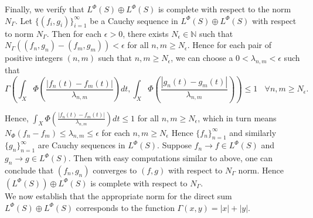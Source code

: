 \documentclass[pdflatex,sn-mathphys-num]{sn-jnl}%
\theoremstyle{thmstyleone}%
\theoremstyle{thmstyletwo}%
\theoremstyle{thmstylethree}%
\begin{document}
Finally, we verify that $L^\Phi(S)\oplus L^\Phi(S)$ is complete with respect to the norm $N_\Gamma$. Let $\{(f_i,g_i)\}_{i=1}^\infty$ be a Cauchy sequence in $L^\Phi(S)\oplus L^\Phi(S)$ with respect to  norm $N_\Gamma$. Then for each $\epsilon>0$, there exists $N_\epsilon\in \mathbb N$ such that $N_\Gamma((f_n,g_n)-(f_m,g_m))<\epsilon$ for all $n,m\geq N_\epsilon$. Hence for each pair of positive integers $(n,m)$ such that $n,m\geq N_\epsilon$, we can choose a $0<\lambda_{n,m}<\epsilon$ such that $$\Gamma\left(\int_X\Phi\left(\frac{|f_n(t)-f_m(t)|}{\lambda_{n,m}}\right)dt, \int_X\Phi\left(\frac{|g_n(t)-g_m(t)|}{\lambda_{n,m}}\right)\right)\leq 1~~~~\forall n,m\geq N_\epsilon.$$

Hence, $\int_X\Phi\left(\frac{|f_n(t)-f_m(t)|}{\lambda_{n,m}}\right)dt\leq 1$ for all $n,m\geq N_\epsilon$, which in turn means $N_\Phi(f_n-f_m)\leq\lambda_{n,m}\leq \epsilon$ for each $n,m\geq N_\epsilon$ Hence $\{f_n\}_{n=1}^\infty$ and similarly $\{g_n\}_{n=1}^\infty$ are Cauchy sequences in $L^\Phi(S)$. Suppose $f_n\to f\in L^\Phi(S)$ and $g_n\to g\in L^\Phi(S)$. Then with easy computations similar to above, one can conclude that $(f_n,g_n)$ converges to $(f,g)$ with respect to $N_\Gamma$ norm. Hence $(L^\Phi(S))\oplus L^\Phi(S)$ is complete with respect to $N_\Gamma$.\\

We now establish that the appropriate norm for the direct sum $L^\Phi(S)\oplus L^\Phi(S)$ corresponds to the function $\Gamma(x,y)=|x|+|y|$.
\end{document}
